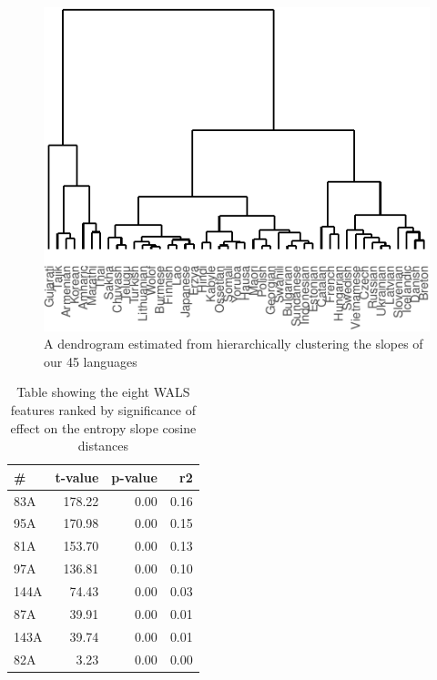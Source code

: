 \documentclass[10pt, letterpaper]{article}
\newenvironment{CodeChunk}{}{}
\begin{document}
\begin{CodeChunk}
\begin{figure}[tb]

{\centering \includegraphics{figs/clust_tree-1} 

}

\caption[A dendrogram estimated from hierarchically clustering the slopes of our 45 languages]{A dendrogram estimated from hierarchically clustering the slopes of our 45 languages}\label{fig:clust_tree}
\end{figure}
\end{CodeChunk}

\begin{table}[tb]
\centering
\begin{tabular}{lrrr}
  \hline
\# & t-value & p-value & r2 \\ 
  \hline
83A & 178.22 & 0.00 & 0.16 \\ 
  95A & 170.98 & 0.00 & 0.15 \\ 
  81A & 153.70 & 0.00 & 0.13 \\ 
  97A & 136.81 & 0.00 & 0.10 \\ 
  144A & 74.43 & 0.00 & 0.03 \\ 
  87A & 39.91 & 0.00 & 0.01 \\ 
  143A & 39.74 & 0.00 & 0.01 \\ 
  82A & 3.23 & 0.00 & 0.00 \\ 
   \hline
\end{tabular}
\caption{Table showing the eight WALS features ranked by significance of effect on the entropy slope cosine distances} 
\label{tab:tab_features}
\end{table}
\end{document}
